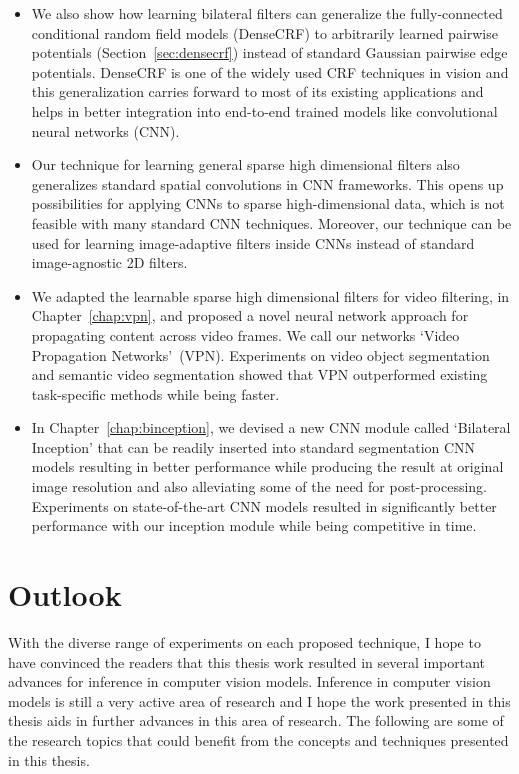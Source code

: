 \begin{itemize}
\item We also show how learning bilateral filters can generalize the fully-connected conditional
random field models (DenseCRF) to arbitrarily learned pairwise potentials (Section~\ref{sec:densecrf})
instead of standard Gaussian pairwise edge potentials.
DenseCRF is one of the widely used CRF techniques in vision and this generalization
carries forward to most of its existing applications and helps in better integration into end-to-end
trained models like convolutional neural networks (CNN).

\item Our technique for learning general sparse high dimensional filters also generalizes standard
spatial convolutions in CNN frameworks. This opens up possibilities for applying CNNs to
sparse high-dimensional data, which is not feasible with many standard CNN techniques. Moreover,
our technique can be used for learning image-adaptive filters inside CNNs instead of standard
image-agnostic 2D filters.

\item We adapted the learnable sparse high dimensional filters for video filtering, in Chapter~\ref{chap:vpn},
and proposed a novel neural network approach for propagating content across video frames.
We call our networks `Video Propagation Networks'~(VPN).
Experiments on video object segmentation and semantic video segmentation showed that VPN
outperformed existing task-specific methods while being faster.

\item In Chapter~\ref{chap:binception}, we devised a new CNN module called `Bilateral Inception'
that can be readily inserted into standard segmentation CNN models resulting in better performance
while producing the result at original image resolution and also alleviating some of the need for
post-processing. Experiments on state-of-the-art CNN models resulted in significantly better
performance with our inception module while being competitive in time.
\end{itemize}

\section{Outlook}

With the diverse range of experiments on each proposed technique, I hope to have
convinced the readers that this thesis work resulted in several important advances
for inference in computer vision models.
Inference in computer vision models is still a very active area of research
and I hope the work presented in this thesis aids in further advances in this
area of research. The following are some of the research topics that could benefit
from the concepts and techniques presented in this thesis.

